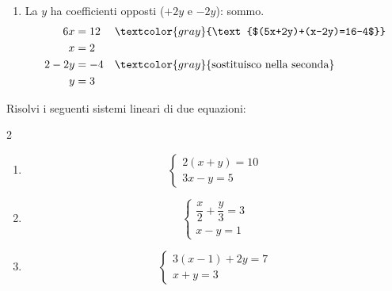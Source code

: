 \begin{question}[ID=1.2, subtitle={Sistemi lineari con coefficienti interi}, difficulty=facile, tags={sistemi, equazioni lineari}]
\begin{explanation}
\begin{enumerate}
    \item La $y$ ha coefficienti opposti ($+2y$ e $-2y$): sommo.
    \[\begin{aligned}
    6x &= 12 && \textcolor{gray}{\text{$(5x+2y)+(x-2y)=16-4$}}\\
    x &= 2\\
    2-2y &= -4 && \textcolor{gray}{\text{sostituisco nella seconda}}\\
    y &= 3
    \end{aligned}\]
\end{enumerate}
\end{explanation}
\end{question}


\begin{question}[ID=1.3, subtitle={Sistemi lineari con parentesi e frazioni}, difficulty=media, tags={sistemi, equazioni lineari}]
Risolvi i seguenti sistemi lineari di due equazioni:
\begin{multicols}{2}
\begin{enumerate}[leftmargin=3.2cm]
    \item
    \[
    \begin{cases}
    2(x+y)=10\\
    3x-y=5
    \end{cases}
    \]

    \item
    \[
    \begin{cases}
    \dfrac{x}{2}+\dfrac{y}{3}=3\\
    x-y=1
    \end{cases}
    \]

    \item
    \[
    \begin{cases}
    3(x-1)+2y=7\\
    x+y=3
    \end{cases}
    \]


\end{enumerate}
\end{multicols}
\end{question}
